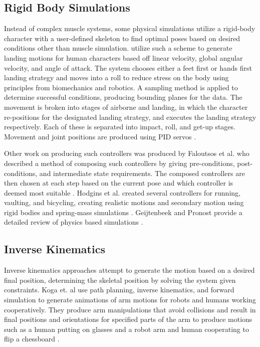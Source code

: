 \subsection{Rigid Body Simulations}
Instead of complex muscle systems, some physical simulations utilize a rigid-body character with a user-defined skeleton to find optimal poses based on desired conditions other than muscle simulation.  \liufall{} utilize such a scheme to generate landing motions for human characters based off linear velocity, global angular velocity, and angle of attack.  The system chooses either a feet first or hands first landing strategy and moves into a roll to reduce stress on the body using principles from biomechanics and robotics.  A sampling method is applied to determine successful conditions, producing bounding planes for the data.  The movement is broken into stages of airborne and landing, in which the character re-positions for the designated landing strategy, and executes the landing strategy respectively. Each of these is separated into impact, roll, and get-up stages.  Movement and joint positions are produced using PID servos \cite{falling_landing}.  

Other work on producing such controllers was produced by Faloutsos et al. who described a method of composing such controllers by giving pre-conditions, post-conditions, and intermediate state requirements.  The composed controllers are then chosen at each step based on the current pose and which controller is deemed most suitable \cite{composable_controllers}.  Hodgins et al. created several controllers for running, vaulting, and bicycling, creating realistic motions and secondary motion using rigid bodies and spring-mass simulations \cite{anim_human_athletics}.  Geijtenbeek and Pronost provide a detailed review of physics based simulations \cite{inter_physics_anim}.

\subsection{Inverse Kinematics}
Inverse kinematics approaches attempt to generate the motion based on a desired final position, determining the skeletal position by solving the system given constraints.  Koga et. al use path planning, inverse kinematics, and forward simulation to generate animations of arm motions for robots and humans working cooperatively.  They produce arm manipulations that avoid collisions and result in final positions and orientations for specified parts of the arm to produce motions such as a human putting on glasses and a robot arm and human cooperating to flip a chessboard \cite{motion_intentions}.  


